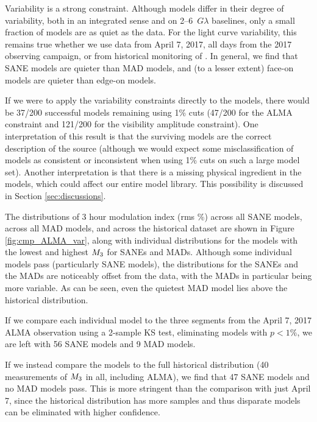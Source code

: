 Variability is a strong constraint.  Although models differ in their degree of variability, both in an integrated sense and on 2--6~$G\lambda$ baselines, only a small fraction of models are as quiet as the data.  For the light curve variability, this remains true whether we use data from April 7, 2017, all days from the 2017 observing campaign, or from historical monitoring of \sgra.   In general, we find that SANE models are quieter than MAD models, and (to a lesser extent) face-on models are quieter than edge-on models.

If we were to apply the variability constraints directly to the models, there would be 37/200 successful models remaining using 1\% cuts (47/200 for the ALMA constraint and 121/200 for the visibility amplitude constraint).  One interpretation of this result is that the surviving models are the correct description of the source (although we would expect some misclassification of models as consistent or inconsistent when using 1\% cuts on such a large model set).  Another interpretation is that there is a missing physical ingredient in the models, which could affect our entire model library. This possibility is discussed in Section \ref{sec:discussions}.


The distributions of 3 hour modulation index (rms \%) across all SANE models, across all MAD models, and across the historical dataset are shown in Figure \ref{fig:cmp_ALMA_var}, along with individual distributions for the models with the lowest and highest $M_{3}$ for SANEs and MADs. Although some individual models  pass (particularly SANE models), the distributions for the SANEs and the MADs are noticeably offset from the data, with the MADs in particular being more variable. As can be seen, even the quietest MAD model lies above the historical distribution.

If we compare each individual model to the three segments from the April 7, 2017 ALMA observation using a 2-sample KS test, eliminating models with $p < 1\%$, we are left with 56 SANE models and 9 MAD models.

If we instead compare the models to the full historical distribution (40 measurements of $M_{3}$ in all, including ALMA), we find that 47 SANE models and no MAD models pass. This is more stringent than the comparison with just April 7, since the historical distribution has more samples and thus disparate models can be eliminated with higher confidence.

